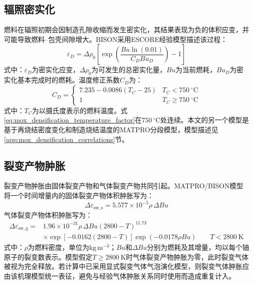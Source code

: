 \subsection{辐照密实化}

燃料在辐照初期会因制造孔隙收缩而发生密实化，其结果表现为负的体积应变，并可能导致燃料--包壳间隙增大。BISON采用ESCORE经验模型描述该过程：
\begin{equation}
	\varepsilon_D
	=\Delta\rho_0
	\left[
	\exp\!\left(
	\frac{Bu\ln(0.01)}{C_DBu_D}
	\right)-1
	\right]
	\label{eq:mox_escore_densification}
\end{equation}
\noindent 式中：$\varepsilon_D$为密实化应变，$\Delta\rho_0$为可发生的总密实化量，$Bu$为当前燃耗，$Bu_D$为密实化基本完成时的燃耗。温度修正系数$C_D$为：
\begin{equation}
	C_D=
	\begin{cases}
		7.235-0.0086(T_C-25) & T_C<750\ ^\circ\mathrm{C}\\
		1                    & T_C\geq750\ ^\circ\mathrm{C}
	\end{cases}
	\label{eq:mox_densification_temperature_factor}
\end{equation}
\noindent 式中：$T_C$为以摄氏度表示的燃料温度。式\eqref{eq:mox_densification_temperature_factor}在$750\,{}^\circ\mathrm{C}$处连续。本文的另一个模型是基于再烧结密度变化和制造烧结温度的MATPRO分段模型，模型描述见\ref{app:mox_densification_correlations}节。

\subsection{裂变产物肿胀}

裂变产物肿胀由固体裂变产物和气体裂变产物共同引起。MATPRO/BISON模型将一个时间增量内的固体裂变产物体积肿胀写为：
\begin{equation}
	\Delta\varepsilon_{\mathrm{sw,s}}
	=5.577\times10^{-5}\rho\,\Delta Bu
	\label{eq:mox_solid_fission_product_swelling}
\end{equation}
气体裂变产物体积肿胀写为：
\begin{equation}
	\begin{aligned}
		\Delta\varepsilon_{\mathrm{sw,g}}
		={}&1.96\times10^{-31}\rho\,\Delta Bu
		(2800-T)^{11.73}\\
		&\times\exp\!\left[-0.0162(2800-T)\right]
		\exp(-0.0178\rho Bu)
		\qquad T<2800\ \mathrm{K}
	\end{aligned}
	\label{eq:mox_gaseous_fission_product_swelling}
\end{equation}
\noindent 式中：$\rho$为燃料密度，单位为$\mathrm{kg\,m^{-3}}$；$Bu$和$\Delta Bu$分别为燃耗及其增量，均以每个铀原子的裂变数表示。模型假定$T\geq2800\ \mathrm{K}$时气体裂变产物肿胀为零，此时裂变气体被视为完全释放。若计算中已采用显式裂变气体气泡演化模型，则裂变气体肿胀应由该机理模型统一表征，避免与经验气体肿胀关系同时使用而造成重复计入。

